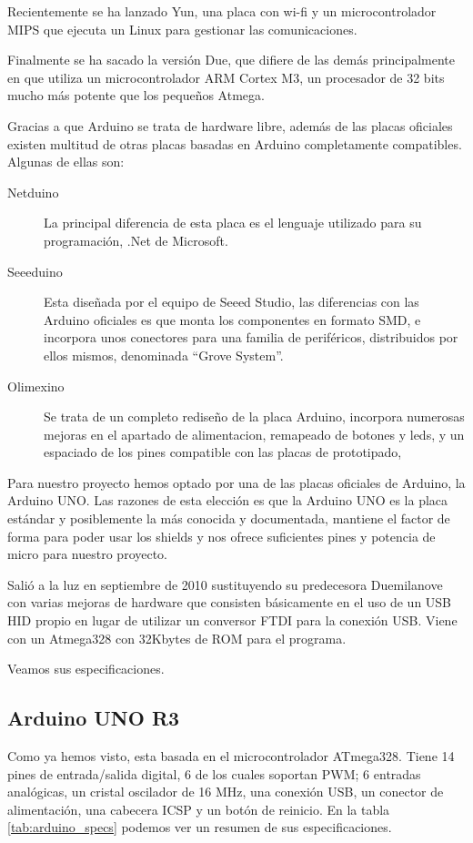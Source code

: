 Recientemente se ha lanzado Yun, una placa con wi-fi y un microcontrolador MIPS que ejecuta un Linux para gestionar las comunicaciones.



Finalmente se ha sacado la versión Due, que difiere de las demás principalmente en que utiliza un microcontrolador ARM Cortex M3, un procesador de 32 bits mucho más potente que los pequeños Atmega.



Gracias a que Arduino se trata de hardware libre, además de las placas oficiales existen multitud de otras placas basadas en Arduino completamente compatibles. Algunas de ellas son:
\begin{description}
\item[Netduino] La principal diferencia de esta placa es el lenguaje utilizado para su programación, .Net de Microsoft. 
\item[Seeeduino] Esta diseñada por el equipo de Seeed Studio, las diferencias con las Arduino oficiales es que monta los componentes en formato SMD, e incorpora unos conectores para una familia de periféricos, distribuidos por ellos mismos, denominada “Grove System”.
\item[Olimexino] Se trata de un completo rediseño de la placa Arduino, incorpora numerosas mejoras en el apartado de alimentacion, remapeado de botones y leds, y un espaciado de los pines compatible con las placas de prototipado, 
\end{description}


Para nuestro proyecto hemos optado por una de las placas oficiales de Arduino, la Arduino UNO. Las razones de esta elección es que la Arduino UNO es la placa estándar y posiblemente la más conocida y documentada, mantiene el factor de forma para poder usar los shields y nos ofrece suficientes pines y potencia de micro para nuestro proyecto.



Salió a la luz en septiembre de 2010 sustituyendo su predecesora Duemilanove con varias mejoras de hardware que consisten básicamente en el uso de un USB HID propio en lugar de utilizar un conversor FTDI para la conexión USB. Viene con un Atmega328 con 32Kbytes de ROM para el programa.



Veamos sus especificaciones.



\subsection{Arduino UNO R3}
Como ya hemos visto, esta basada en el microcontrolador ATmega328. Tiene 14 pines de entrada/salida digital, 6 de los cuales soportan PWM; 6 entradas analógicas, un cristal oscilador de 16 MHz, una conexión USB, un conector de alimentación, una cabecera ICSP y un botón de reinicio. En la tabla \ref{tab:arduino_specs} podemos ver un resumen de sus especificaciones.


